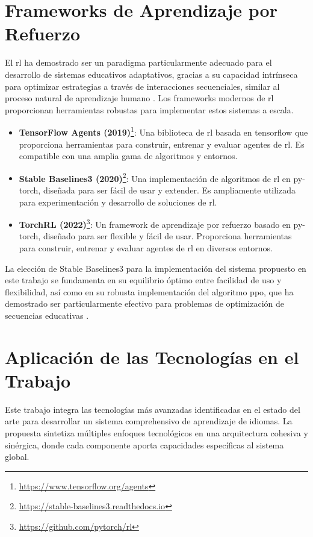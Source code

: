 \section{Frameworks de Aprendizaje por Refuerzo}
\label{sec:frameworks-rl}

El \gls{rl} ha demostrado ser un paradigma particularmente adecuado para el desarrollo de sistemas educativos adaptativos, gracias a su capacidad intrínseca para optimizar estrategias a través de interacciones secuenciales, similar al proceso natural de aprendizaje humano \cite{williams2017educational}. Los frameworks modernos de \gls{rl} proporcionan herramientas robustas para implementar estos sistemas a escala.


\begin{itemize}
  \item \textbf{TensorFlow Agents (2019)}\footnote{\url{https://www.tensorflow.org/agents}}: Una biblioteca de \gls{rl} basada en \gls{tensorflow} que proporciona herramientas para construir, entrenar y evaluar agentes de \gls{rl}. Es compatible con una amplia gama de algoritmos y entornos.
  \item \textbf{Stable Baselines3 (2020)}\footnote{\url{https://stable-baselines3.readthedocs.io}}: Una implementación de algoritmos de \gls{rl} en \gls{py-torch}, diseñada para ser fácil de usar y extender. Es ampliamente utilizada para experimentación y desarrollo de soluciones de \gls{rl}.
  \item \textbf{TorchRL (2022)}\footnote{\url{https://github.com/pytorch/rl}}: Un framework de aprendizaje por refuerzo basado en \gls{py-torch}, diseñado para ser flexible y fácil de usar. Proporciona herramientas para construir, entrenar y evaluar agentes de \gls{rl} en diversos entornos.
\end{itemize}

La elección de Stable Baselines3 para la implementación del sistema propuesto en este trabajo se fundamenta en su equilibrio óptimo entre facilidad de uso y flexibilidad, así como en su robusta implementación del algoritmo \gls{ppo}, que ha demostrado ser particularmente efectivo para problemas de optimización de secuencias educativas \citep{schulman2017proximal}.


\section{Aplicación de las Tecnologías en el Trabajo}
\label{sec:aplicacion-tecnologias}

Este trabajo integra las tecnologías más avanzadas identificadas en el estado del arte para desarrollar un sistema comprehensivo de aprendizaje de idiomas. La propuesta sintetiza múltiples enfoques tecnológicos en una arquitectura cohesiva y sinérgica, donde cada componente aporta capacidades específicas al sistema global.

